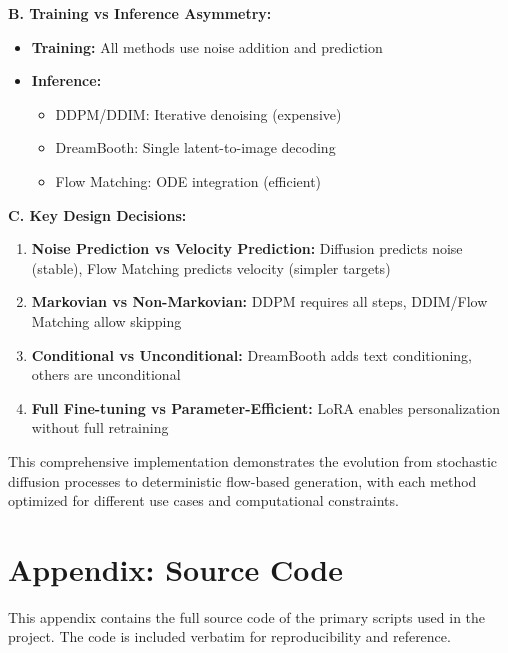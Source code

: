 \documentclass[a4paper,12pt]{article}
\begin{document}
\textbf{B. Training vs Inference Asymmetry:}
\begin{itemize}
    \item \textbf{Training:} All methods use noise addition and prediction
    \item \textbf{Inference:} 
    \begin{itemize}
        \item DDPM/DDIM: Iterative denoising (expensive)
        \item DreamBooth: Single latent-to-image decoding
        \item Flow Matching: ODE integration (efficient)
    \end{itemize}
\end{itemize}

\textbf{C. Key Design Decisions:}
\begin{enumerate}
    \item \textbf{Noise Prediction vs Velocity Prediction:} Diffusion predicts noise (stable), Flow Matching predicts velocity (simpler targets)
    \item \textbf{Markovian vs Non-Markovian:} DDPM requires all steps, DDIM/Flow Matching allow skipping
    \item \textbf{Conditional vs Unconditional:} DreamBooth adds text conditioning, others are unconditional
    \item \textbf{Full Fine-tuning vs Parameter-Efficient:} LoRA enables personalization without full retraining
\end{enumerate}

This comprehensive implementation demonstrates the evolution from stochastic diffusion processes to deterministic flow-based generation, with each method optimized for different use cases and computational constraints.

\newpage
\section{Appendix: Source Code}

This appendix contains the full source code of the primary scripts used in the project. The code is included verbatim for reproducibility and reference.
\end{document}
